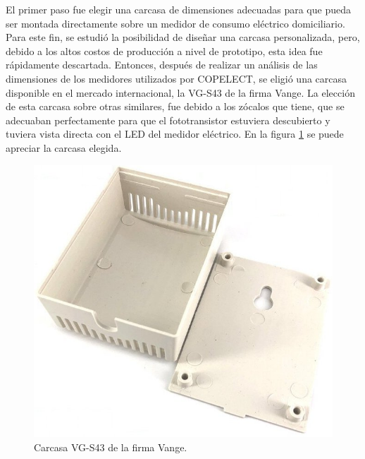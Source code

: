 El primer paso fue elegir una carcasa de dimensiones adecuadas para que pueda ser montada directamente sobre un medidor de consumo eléctrico domiciliario. Para este fin, se estudió la posibilidad de diseñar una carcasa personalizada, pero, debido a los altos costos de producción a nivel de prototipo, esta idea fue rápidamente descartada. Entonces, después de realizar un análisis de las dimensiones de los medidores utilizados por COPELECT, se eligió una carcasa disponible en el mercado internacional, la VG-S43 de la firma Vange. La elección de esta carcasa sobre otras similares, fue debido a los zócalos que tiene, que se adecuaban perfectamente para que el fototransistor estuviera descubierto y tuviera vista directa con el LED del medidor eléctrico. En la figura \ref{fig:case} se puede apreciar la carcasa elegida.

\begin{figure}[h]
	\centering
	\includegraphics[scale=0.4]{./Figures/case.jpg}
	\caption{Carcasa VG-S43 de la firma Vange\protect\footnotemark.}
		\label{fig:case}
\end{figure}


